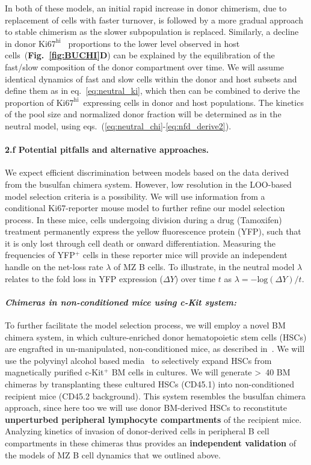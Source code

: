 \documentclass[11pt]{article}
\newcommand{\khi}{\ensuremath{\text{Ki67}^\text{hi}}~}
\newcommand{\para}[1]{\vspace*{-4.5mm}\paragraph{#1}}
\begin{document}
In both of these models, an initial rapid increase in donor chimerism, due to replacement of cells with faster turnover, is followed by a more gradual approach to stable chimerism as the slower subpopulation is replaced.
Similarly, a decline in donor {\khi} proportions to the lower level observed in host cells~(\textbf{Fig.~\ref{fig:BUCHI}D}) can be explained by the equilibration of the fast/slow composition of the donor compartment over time.
We will assume identical dynamics of fast and slow cells within the donor and host subsets and define them as in eq.~\ref{eq:neutral_ki}, which then can be combined to derive the proportion of \khi expressing cells in donor and host populations.
The kinetics of the pool size and normalized donor fraction will be determined as in the neutral model, using eqs.~(\ref{eq:neutral_chi}-\ref{eq:nfd_derive2}).

 
\para{2.f Potential pitfalls and alternative approaches.}
We expect efficient discrimination between models based on the data derived from the busulfan chimera system.
However, low resolution in the LOO-based model selection criteria is a possibility.
We will use information from a conditional Ki67-reporter mouse model to further refine our model selection process.
In these mice, cells undergoing division during a drug (Tamoxifen) treatment permanently express the yellow fluorescence protein (YFP), such that it is only lost through cell death or onward differentiation. %
Measuring the frequencies of YFP$^+$ cells in these reporter mice will provide an independent handle on the net-loss rate $\lambda$ of MZ B cells.
To illustrate, in the neutral model $\lambda$ relates to the fold loss in YFP expression ($\Delta Y$) over time $t$ as $\lambda = - \text{log}(\Delta Y)/t$.

\para{\textit{Chimeras in non-conditioned mice using c-Kit system:}}
To further facilitate the model selection process, we will employ a novel BM chimera system, in which culture-enriched donor hematopoietic stem cells (HSCs) are engrafted in un-manipulated, non-conditioned mice, as described in~\citet{Ochi_2021}.
We will use the polyvinyl alcohol based media~\cite{Wilkinson_2020} to selectively expand HSCs from magnetically purified c-Kit$^+$ BM cells in cultures.
We will generate >~40 BM chimeras by transplanting these cultured HSCs (CD45.1) into non-conditioned recipient mice (CD45.2 background).
This system resembles the busulfan chimera approach, since here too we will use donor BM-derived HSCs to reconstitute \textbf{unperturbed peripheral lymphocyte compartments} of the recipient mice.
Analyzing kinetics of invasion of donor-derived cells in peripheral B cell compartments in these chimeras thus provides an \textbf{independent validation} of the models of MZ B cell dynamics that we outlined above.
\end{document}
